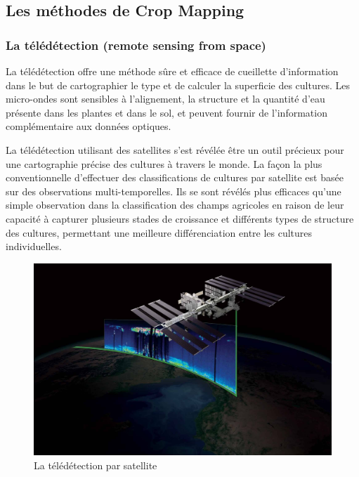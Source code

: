 \documentclass[12pt, openany]{report}
\begin{document}
\subsection{Les méthodes de Crop Mapping}

\subsubsection{La télédétection (remote sensing from space)}

La télédétection offre une méthode sûre et efficace de cueillette d'information dans le but de cartographier le type et de calculer la superficie des cultures.
Les micro-ondes sont sensibles à l'alignement, la structure et la quantité d'eau présente dans les plantes et dans le sol, et peuvent fournir de l'information complémentaire aux données optiques. 

\par
La télédétection utilisant des satellites s'est révélée être un outil précieux pour une cartographie précise des cultures à travers le monde. La façon la plus conventionnelle d'effectuer des classifications de cultures par satellite est basée sur des observations multi-temporelles. Ils se sont révélés plus efficaces qu'une simple observation dans la classification des champs agricoles en raison de leur capacité à capturer plusieurs stades de croissance et différents types de structure des cultures, permettant une meilleure différenciation entre les cultures individuelles. \cite{cropmapp}

\begin{figure}[H]
\centering
\includegraphics[scale=0.15]{tele.jpg}
\caption{La télédétection par satellite}
\end{figure}
\end{document}
